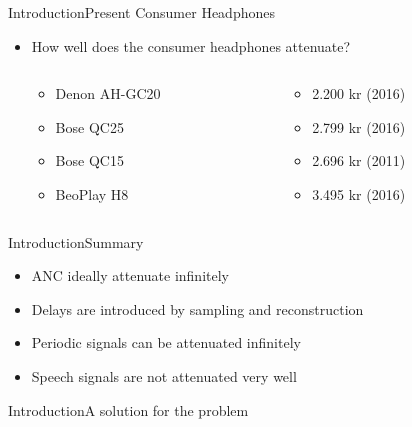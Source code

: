 \begin{frame}{Introduction}{Present Consumer Headphones}
	\begin{itemize}	
	\item How well does the consumer headphones attenuate?
	\begin{columns}
		\begin{column}{0.27\textwidth}
		\begin{itemize}
			\item Denon AH-GC20
			\item Bose QC25 
			\item Bose QC15 	
			\item BeoPlay H8 	
		\end{itemize}
		\end{column}
		\begin{column}{0.6\textwidth} 
		\begin{itemize}
			\item[] 2.200 kr (2016)
			\item[] 2.799 kr (2016)
			\item[] 2.696 kr (2011)
			\item[] 3.495 kr (2016)
		\end{itemize}
		\end{column}
	\end{columns}
	\end{itemize}			
	\begin{center}
		
	\end{center}	
\end{frame}

\begin{frame}{Introduction}{Summary}		
	\begin{itemize}
		\item ANC ideally attenuate infinitely 
		\item Delays are introduced by sampling and reconstruction
		\item Periodic signals can be attenuated infinitely
		\item Speech signals are not attenuated very well
	\end{itemize}
\end{frame}


\begin{frame}{Introduction}{A solution for the problem}		
\end{frame}


